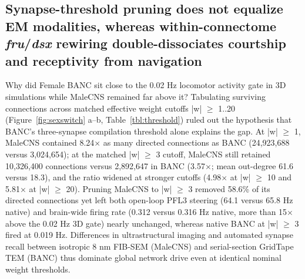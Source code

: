 \documentclass[11pt,a4paper]{article}
\begin{document}
\subsection{Synapse-threshold pruning does not equalize EM modalities, whereas within-connectome \emph{fru}/\emph{dsx} rewiring double-dissociates courtship and receptivity from navigation}
Why did Female BANC sit close to the 0.02 Hz locomotor activity gate in 3D simulations while MaleCNS remained far above it? Tabulating surviving connections across matched effective weight cutoffs |w| $\geq$ 1..20 (Figure~\ref{fig:sexswitch} a--b, Table~\ref{tbl:threshold}) ruled out the hypothesis that BANC's three-synapse compilation threshold alone explains the gap. At |w| $\geq$ 1, MaleCNS contained 8.24$\times$ as many directed connections as BANC (24,923,688 versus 3,024,654); at the matched |w| $\geq$ 3 cutoff, MaleCNS still retained 10,326,400 connections versus 2,892,647 in BANC (3.57$\times$; mean out-degree 61.6 versus 18.3), and the ratio widened at stronger cutoffs (4.98$\times$ at |w| $\geq$ 10 and 5.81$\times$ at |w| $\geq$ 20). Pruning MaleCNS to |w| $\geq$ 3 removed 58.6\% of its directed connections yet left both open-loop PFL3 steering (64.1 versus 65.8 Hz native) and brain-wide firing rate (0.312 versus 0.316 Hz native, more than 15$\times$ above the 0.02 Hz 3D gate) nearly unchanged, whereas native BANC at |w| $\geq$ 3 fired at 0.019 Hz. Differences in ultrastructural imaging and automated synapse recall between isotropic 8 nm FIB-SEM (MaleCNS) and serial-section GridTape TEM (BANC) thus dominate global network drive even at identical nominal weight thresholds.
\end{document}
